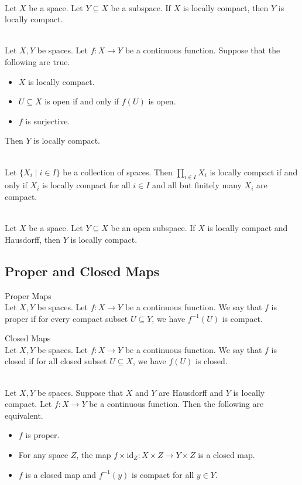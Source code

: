 \documentclass[a4paper]{article}
\begin{document}
\begin{prp}{}{}\\
Let $X$ be a space. Let $Y\subseteq X$ be a subspace. If $X$ is locally compact, then $Y$ is locally compact. 
\end{prp}

\begin{prp}{}{}\\
Let $X,Y$ be spaces. Let $f:X\to Y$ be a continuous function. Suppose that the following are true. 
\begin{itemize}
\item $X$ is locally compact. 
\item $U\subseteq X$ is open if and only if $f(U)$ is open. 
\item $f$ is surjective. 
\end{itemize}
Then $Y$ is locally compact. 
\end{prp}

\begin{prp}{}{}\\
Let $\{X_i\;|\;i\in I\}$ be a collection of spaces. Then $\prod_{i\in I}X_i$ is locally compact if and only if $X_i$ is locally compact for all $i\in I$ and all but finitely many $X_i$ are compact. 
\end{prp}

\begin{prp}{}{}\\
Let $X$ be a space. Let $Y\subseteq X$ be an open subspace. If $X$ is locally compact and Hausdorff, then $Y$ is locally compact. 
\end{prp}

\subsection{Proper and Closed Maps}
\begin{defn}{Proper Maps}{}\\
Let $X,Y$ be spaces. Let $f:X\to Y$ be a continuous function. We say that $f$ is proper if for every compact subset $U\subseteq Y$, we have $f^{-1}(U)$ is compact. 
\end{defn}

\begin{defn}{Closed Maps}{}\\
Let $X,Y$ be spaces. Let $f:X\to Y$ be a continuous function. We say that $f$ is closed if for all closed subset $U\subseteq X$, we have $f(U)$ is closed. 
\end{defn}

\begin{prp}{}{}\\
Let $X,Y$ be spaces. Suppose that $X$ and $Y$ are Hausdorff and $Y$ is locally compact. Let $f:X\to Y$ be a continuous function. Then the following are equivalent. 
\begin{itemize}
\item $f$ is proper. 
\item For any space $Z$, the map $f\times\text{id}_Z:X\times Z\to Y\times Z$ is a closed map. 
\item $f$ is a closed map and $f^{-1}(y)$ is compact for all $y\in Y$. 
\end{itemize}
\end{prp}
\end{document}
